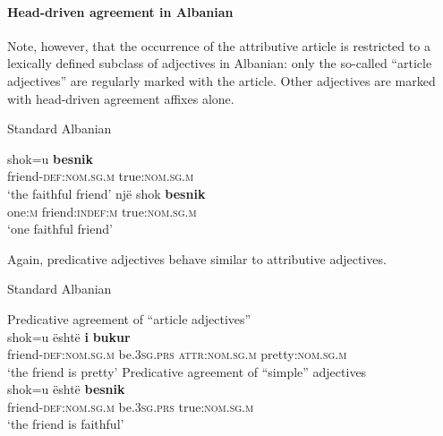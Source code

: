 \paragraph*{Head\hyp{}driven agreement in Albanian}
Note, however, that the occurrence of the attributive article is restricted to a lexically defined subclass of adjectives in Albanian: only the so-called “article adjectives” are regularly marked with the article. Other adjectives are marked with head\hyp{}driven agreement affixes alone.
\begin{exe}
\ex \rm{Standard Albanian \citep[examples from][167]{himmelmann1997}}
\begin{xlist}
\ex
\gll	shok=u					\textbf{besnik}\\
	friend-\textsc{def:nom.sg.m} 	true:\textsc{nom.sg.m}\\
\glt	‘the faithful friend’
\ex
\gll 	një			shok					\textbf{besnik}\\
	one:\textsc{m}	friend:\textsc{indef:m} 	true:\textsc{nom.sg.m}\\
\glt	‘one faithful friend’
\end{xlist}
\end{exe}
Again, predicative adjectives behave similar to attributive adjectives.
\begin{exe}
\ex \rm{Standard Albanian \citep{demiraj1998}}\\
\begin{xlist}
\ex \rm{Predicative agreement of “article adjectives”}\\
\gll	shok=u është \textbf{i} \textbf{bukur}\\
	friend-\textsc{def:nom.sg.m} be\textsc{.3sg.prs} \textsc{attr:nom.sg.m} pretty:\textsc{nom.sg.m}\\
\glt	‘the friend is pretty’
\ex \rm{Predicative agreement of “simple” adjectives}\\
\gll	shok=u është \textbf{besnik}\\
	friend-\textsc{def:nom.sg.m} be\textsc{.3sg.prs} true:\textsc{nom.sg.m}\\
\glt	‘the friend is faithful’
\end{xlist}
\end{exe}

